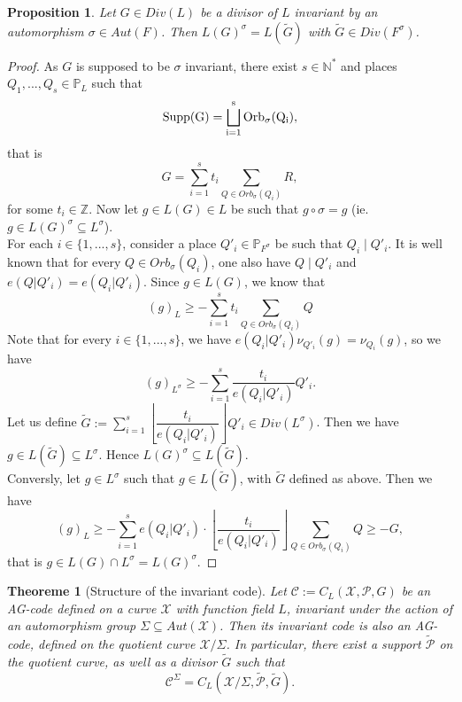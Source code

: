 \documentclass[10pt]{article}
\newtheorem{thm}{Theoreme}[]
\newtheorem{prop1}{Proposition}[]
\newcommand{\s}{\vspace{0.3cm}}
\newcommand{\cd}{\cdot}
\newcommand{\N}{\mathbb{N}}
\newcommand{\Z}{\mathbb{Z}}
\newcommand{\su}{\subseteq}
\newcommand{\X}{\mathcal{X}}
\newcommand{\PR}{\mathcal{P}}
\begin{document}
\s

\begin{prop1}
Let $G \in Div(L)$ be a divisor of $L$ invariant by an automorphism $\sigma \in Aut(F)$. Then $L(G)^{\sigma} = L(\tilde{G})$ with $\tilde{G} \in Div(F^{\sigma})$.
\end{prop1}

\s

\begin{proof}
As $G$ is supposed to be $\sigma$ invariant, there exist $s \in \N^*$ and places $Q_1,...,Q_s \in \mathbb{P}_L$ such that 
\[\rm{Supp(G)} = \bigsqcup_{i=1}^s Orb_{\sigma}(Q_i),\]
that is 
\[G = \sum\limits_{i=1}^s t_i \sum\limits_{Q \in Orb_{\sigma}(Q_i)} R,\]
for some $t_i \in \Z$. Now let $g \in L(G) \in L$ be such that $g \circ \sigma = g$ (ie. $g \in L(G)^{\sigma} \su L^{\sigma}$). \\
For each $i \in \{1,...,s\}$, consider a place $Q'_i \in \mathbb{P}_{F^{\sigma}}$ be such that $Q_i \mid Q'_i$. It is well known that for every $Q \in Orb_{\sigma}(Q_i)$, one also have $Q \mid Q'_i$ and $e(Q|Q'_i)=e(Q_i|Q'_i)$. Since $g \in L(G)$, we know that
\[(g)_L \geq - \sum\limits_{i=1}^s t_i \sum\limits_{Q \in Orb_{\sigma}(Q_i)} Q\]
Note that for every $i \in \{1,...,s\}$, we have $e(Q_i|Q'_i)\nu_{Q'_i}(g) = \nu_{Q_i}(g)$, so we have 
\[(g)_{L^{\sigma}} \geq - \sum\limits_{i=1}^s \dfrac{t_i}{e(Q_i|Q'_i)}  Q'_i.\]
Let us define $\tilde{G}:= \sum\limits_{i=1}^s \left\lfloor\dfrac{t_i}{e(Q_i|Q'_i)}\right\rfloor  Q'_i \in Div(L^{\sigma})$. Then we have $g \in L(\tilde{G}) \su L^{\sigma}$. Hence $L(G)^{\sigma} \su L(\tilde{G})$. \\
Conversly, let $g \in L^{\sigma}$ such that $g \in L(\tilde{G})$, with $\tilde{G}$ defined as above. Then we have 
\[ (g)_L \geq -\sum\limits_{i=1}^s e(Q_i|Q'_i) \cd \left\lfloor\dfrac{t_i}{e(Q_i|Q'_i)}\right\rfloor \sum\limits_{Q \in Orb_{\sigma}(Q_i)} Q \geq -G,\]
that is $g \in L(G) \cap L^{\sigma} = L(G)^{\sigma}$.
\end{proof}

\s

\begin{thm} [Structure of the invariant code]
Let $\mathcal{C} := C_L(\X,\PR,G)$ be an AG-code defined on a curve $\X$ with function field $L$, invariant under the action of an automorphism group $\Sigma \su Aut(\X)$. Then its invariant code is also an AG-code, defined on the quotient curve $\X/\Sigma$. In particular, there exist a support $\tilde{\PR}$ on the quotient curve, as well as a divisor $\tilde{G}$ such that
\[\mathcal{C}^{\Sigma} = C_L(\X/\Sigma,\tilde{\PR},\tilde{G}).\]
\end{thm}
\end{document}
